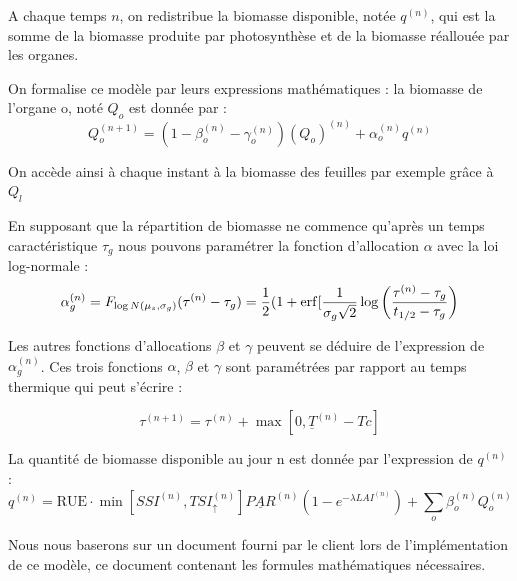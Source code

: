 A chaque temps $n$, on redistribue la biomasse disponible, notée $q^{(n)}$, qui est la somme de la biomasse produite par photosynthèse et de la biomasse réallouée par les organes.

On formalise ce modèle par leurs expressions mathématiques : 
la biomasse de l'organe o, noté $Q_o$ est donnée par :
\[ {Q_o^{(n+1)}} = (1-\beta_o^{(n)}-\gamma_o^{(n)} )(Q_o)^{(n)} +\alpha_o^{(n)}q^{(n)} \]

On accède ainsi à chaque instant à la biomasse des feuilles par exemple grâce à $Q_l$

En supposant que la répartition de biomasse ne commence qu'après un temps caractéristique $\tau_g$ nous pouvons paramétrer la fonction d'allocation $\alpha$ avec la loi log-normale :
\[ {\alpha_g^{(n)}}=F_{\log N(\mu_s,\sigma_g)}(\tau^{(n)}-\tau_g)=\frac{1}{2} (1+\operatorname{erf}[\frac{1}{\sigma_g \sqrt{2}}\log\left(\frac{\tau^{(n)}-\tau_g}{t_{1/2}-\tau_g}\right) \]

Les autres fonctions d'allocations $\beta$ et $\gamma$   peuvent se déduire de l'expression de $\alpha_g^{(n)}$.
Ces trois fonctions $\alpha$, $\beta$ et $\gamma$ sont paramétrées par rapport au temps thermique qui peut s'écrire :

\[ {\tau}^{(n+1)}=\tau^{(n)}+\max[0,\underline{T}^{(n)}-Tc] \]

La quantité de biomasse disponible au jour n est donnée par l'expression de $q^{(n)}$ :
\[ 
{q^{(n)}} = \text{RUE}\cdot \min[SSI^{(n)}, TSI_\uparrow^{(n)}]\underline{PAR}^{(n)}(1-e^{-\lambda LAI^{(n)}})+\sum_o \beta_o^{(n)}Q_o^{(n)} 
\]

Nous nous baserons sur un document fourni par le client lors de l'implémentation de ce modèle, ce document contenant les formules mathématiques nécessaires.

